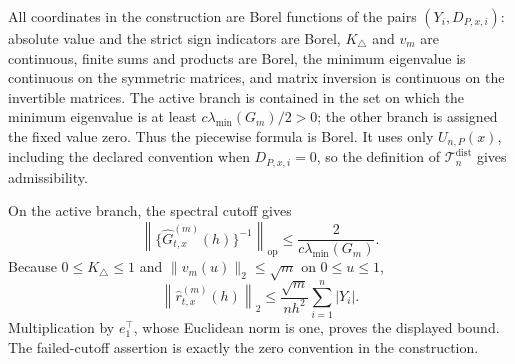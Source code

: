 All coordinates in the construction are Borel functions of the pairs \((Y_i,D_{P,x,i})\): absolute value and the strict sign indicators are Borel, \(K_\triangle\) and \(v_m\) are continuous, finite sums and products are Borel, the minimum eigenvalue is continuous on the symmetric matrices, and matrix inversion is continuous on the invertible matrices.  The active branch is contained in the set on which the minimum eigenvalue is at least \(c\lambda_{\min}(G_m)/2>0\); the other branch is assigned the fixed value zero.  Thus the piecewise formula is Borel.  It uses only \(U_{n,P}(x)\), including the declared convention when \(D_{P,x,i}=0\), so the definition of \(\mathcal T_n^{\mathrm{dist}}\) gives admissibility.

On the active branch, the spectral cutoff gives
\[
 \left\|\{\widehat G^{(m)}_{t,x}(h)\}^{-1}\right\|_{\mathrm{op}}
 \leq\frac{2}{c\lambda_{\min}(G_m)}.
\]
Because \(0\leq K_\triangle\leq1\) and \(\|v_m(u)\|_2\leq\sqrt m\) on \(0\leq u\leq1\),
\[
 \left\|\widehat r^{(m)}_{t,x}(h)\right\|_2
 \leq\frac{\sqrt m}{nh^2}\sum_{i=1}^n|Y_i|.
\]
Multiplication by \(e_1^\top\), whose Euclidean norm is one, proves the displayed bound.  The failed-cutoff assertion is exactly the zero convention in the construction.